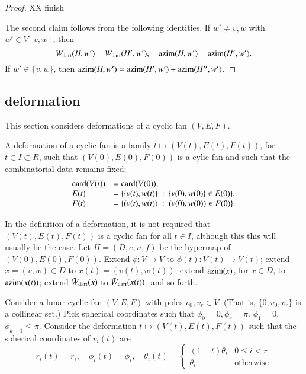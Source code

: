 \begin{proof}
XX finish

The second claim follows from the following identities.
If $w'\ne v,w$ with $w'\in V[v,w]$, then
$$
W_{\text{dart}}(H,w')=W_{\text{dart}}(H',w'),\quad {\operatorname{azim}}(H,w') = {\operatorname{azim}}(H',w').
$$
If $w'\in\{v,w\}$, then
${\operatorname{azim}}(H,w')={\operatorname{azim}}(H',w') +{\operatorname{azim}}(H'',w')$.
\end{proof}

\subsection{deformation}

This section considers deformations of a cyclic fan $(V,E,F)$.

\begin{definition}
A deformation of a cyclic fan is a family $t\mapsto (V(t),E(t),F(t))$, for $t\in I\subset\ring{R}$, such that $(V(0),E(0),F(0))$ is a cylic fan and such that the combinatorial data remains fixed:
$$
\begin{array}{lll}
{\operatorname{card}}(V(t)) &= {\operatorname{card}}(V(0)),\\
E(t)&=\{\{v(t),w(t)\}\ :\  \{v(0),w(0)\}\in E(0)\},\\
F(t)&= \{(v(t),w(t)) \ :\   (v(0),w(0))\in F(0)\}.
\end{array}
$$
\end{definition}

In the definition of a deformation, it is not required that $(V(t),E(t),F(t))$ is a cyclic fan for all $t\in I$, although this this will usually be the case.  Let $H=(D,e,n,f)$ be the hypermap of $(V(0),E(0),F(0))$.  Extend $\phi:V\to V$ to $\phi(t):V(t)\to V(t)$; extend $x=(v,w)\in D$ to $x(t)=(v(t),w(t))$; extend ${\operatorname{azim}}(x)$, for $x\in D$,  to ${\operatorname{azim}}(x(t))$; extend $\bar W_{\text{dart}}(x)$ to $\bar W_{\text{dart}}(x(t))$, and so forth. 


Consider a lunar cyclic fan $(V,E,F)$ with poles $v_0,v_r\in V$.  (That is, $\{0,v_0,v_r\}$ is a collinear set.)   Pick spherical coordinates such that $\phi_0=0,\phi_r=\pi$.  $\phi_1=0$, $\phi_{k-1}\le\pi$.  Consider the deformation $t\mapsto (V(t),E(t),F(t))$ such that the spherical coordinates of $v_i(t)$ are
$$
r_i(t)=r_i,\quad \phi_i(t)=\phi_i,\quad \theta_i(t) =
\begin{cases} 
   (1-t) \theta_i & 0\le i< r\\ 
   \theta_i & \text{otherwise}
\end{cases}
$$

